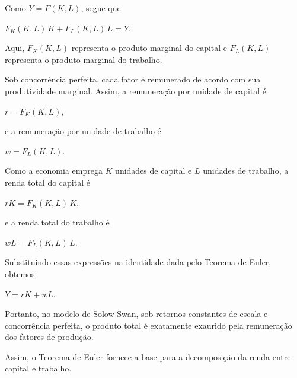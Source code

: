 \documentclass[12pt]{article}
\begin{document}
Como $Y = F(K,L)$, segue que

$F_K(K,L)\,K + F_L(K,L)\,L = Y$.

Aqui, $F_K(K,L)$ representa o produto marginal do capital e $F_L(K,L)$ representa o produto marginal do trabalho.

Sob concorrência perfeita, cada fator é remunerado de acordo com sua produtividade marginal. Assim, a remuneração por unidade de capital é

$r = F_K(K,L)$,

e a remuneração por unidade de trabalho é

$w = F_L(K,L)$.

Como a economia emprega $K$ unidades de capital e $L$ unidades de trabalho, a renda total do capital é

$rK = F_K(K,L)\,K$,

e a renda total do trabalho é

$wL = F_L(K,L)\,L$.

Substituindo essas expressões na identidade dada pelo Teorema de Euler, obtemos

$Y = rK + wL$.

Portanto, no modelo de Solow-Swan, sob retornos constantes de escala e concorrência perfeita, o produto total é exatamente exaurido pela remuneração dos fatores de produção. 

Assim, o Teorema de Euler fornece a base para a decomposição da renda entre capital e trabalho.








\end{document}
